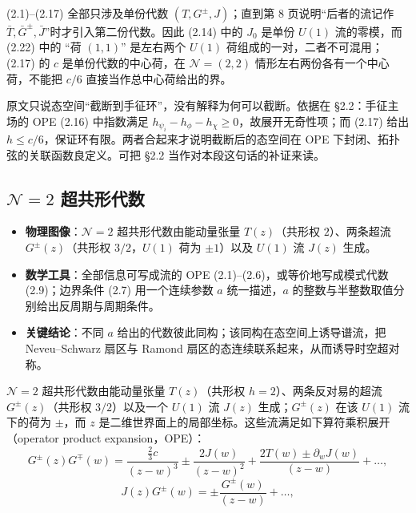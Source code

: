 \begin{yizhu}[易错点]
(2.1)--(2.17) 全部只涉及单份代数 $(T,G^{\pm},J)$；直到第 8 页说明“后者的流记作 $\bar T,\bar G^{\pm},\bar J$”时才引入第二份代数。因此 (2.14) 中的 $J_{0}$ 是单份 $U(1)$ 流的零模，而 (2.22) 中的 “荷 $(1,1)$” 是左右两个 $U(1)$ 荷组成的一对，二者不可混用；(2.17) 的 $c$ 是单份代数的中心荷，在 $\mathcal{N}=(2,2)$ 情形左右两份各有一个中心荷，不能把 $c/6$ 直接当作总中心荷给出的界。
\end{yizhu}

\begin{yizhu}[含糊点]
原文只说态空间“截断到手征环”，没有解释为何可以截断。依据在 §2.2：手征主场的 OPE (2.16) 中指数满足 $h_{\psi_{i}}-h_{\phi}-h_{\chi}\ge 0$，故展开无奇性项；而 (2.17) 给出 $h\le c/6$，保证环有限。两者合起来才说明截断后的态空间在 OPE 下封闭、拓扑弦的关联函数良定义。可把 §2.2 当作对本段这句话的补证来读。
\end{yizhu}

\subsection{\texorpdfstring{$\mathcal{N}=2$}{N=2} 超共形代数}
\label{sec:2.1}

\begin{keytakeaways}
  \begin{itemize}[leftmargin=1.4em,itemsep=2pt,topsep=2pt]
    \item \textbf{物理图像}：$\mathcal{N}=2$ 超共形代数由能动量张量 $T(z)$（共形权 $2$）、两条超流 $G^{\pm}(z)$（共形权 $3/2$，$U(1)$ 荷为 $\pm1$）以及 $U(1)$ 流 $J(z)$ 生成。
    \item \textbf{数学工具}：全部信息可写成流的 OPE (2.1)--(2.6)，或等价地写成模式代数 (2.9)；边界条件 (2.7) 用一个连续参数 $a$ 统一描述，$a$ 的整数与半整数取值分别给出反周期与周期条件。
    \item \textbf{关键结论}：不同 $a$ 给出的代数彼此同构；该同构在态空间上诱导谱流，把 Neveu--Schwarz 扇区与 Ramond 扇区的态连续联系起来，从而诱导时空超对称。
  \end{itemize}
\end{keytakeaways}

$\mathcal{N}=2$ 超共形代数由能动量张量 $T(z)$（共形权 $h=2$）、两条反对易的超流 $G^{\pm}(z)$（共形权 $3/2$）以及一个 $U(1)$ 流 $J(z)$ 生成；$G^{\pm}(z)$ 在该 $U(1)$ 流下的荷为 $\pm$，而 $z$ 是二维世界面上的局部坐标。这些流满足如下算符乘积展开（operator product expansion，OPE）：
\begin{equation}\tag{2.1}
G^{\pm}(z)G^{\mp}(w)=\frac{\frac{2}{3}c}{(z-w)^{3}}\pm\frac{2J(w)}{(z-w)^{2}}+\frac{2T(w)\pm\partial_{w}J(w)}{(z-w)}+\ldots,
\end{equation}
\begin{equation}\tag{2.2}
J(z)G^{\pm}(w)=\pm\frac{G^{\pm}(w)}{(z-w)}+\ldots,
\end{equation}

